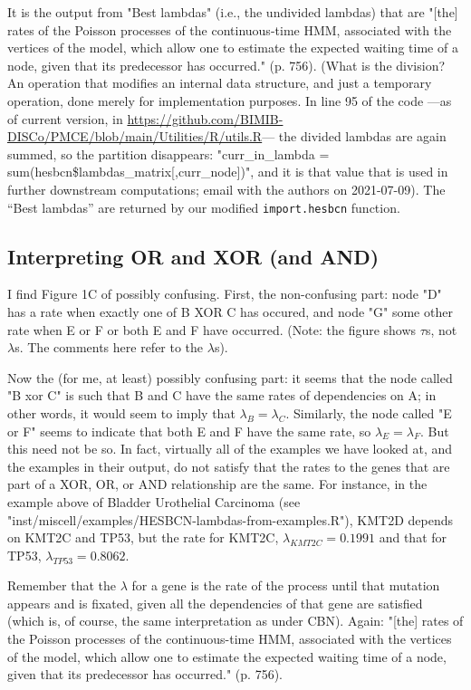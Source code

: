 \documentclass[a4paper,11pt]{article}
\begin{document}
It is the output from "Best lambdas" (i.e., the undivided lambdas) that are "[the] rates of the Poisson processes of the continuous-time HMM, associated with the vertices of the model, which allow one to estimate the expected waiting time of a node, given that its predecessor has occurred." (p. 756). (What is the division? An  operation that modifies an internal data structure, and just a temporary operation, done merely for implementation purposes. In line 95 of the code ---as of current version, in \url{https://github.com/BIMIB-DISCo/PMCE/blob/main/Utilities/R/utils.R}--- the divided lambdas are again summed, so the partition disappears: "curr\_in\_lambda = sum(hesbcn\$lambdas\_matrix[,curr\_node])", and it is that value that is used in further downstream computations;  email with the authors on 2021-07-09). The ``Best lambdas'' are returned by our modified \texttt{import.hesbcn} function.


\subsection{Interpreting OR and XOR (and AND)}

I find Figure 1C  of  \cite{angaroni2021} possibly confusing. First, the non-confusing part:  node "D" has a rate when exactly one of B XOR C has occured, and node "G" some other rate when E or F or both E and F have occurred. (Note: the figure shows $\tau$s, not $\lambda$s. The comments here refer to the $\lambda$s).


Now the (for me, at least) possibly confusing part: it seems that the node called "B xor C" is such that B and C have the same rates of dependencies on A; in other words, it would seem to imply that \(\lambda_B = \lambda_C\). Similarly, the node called "E or F" seems to indicate that both E and F have the same rate, so \(\lambda_E = \lambda_F\). But this need not be so. In fact, virtually all of the examples we have looked at, and the examples in their output, do not satisfy that the rates to the genes that are part of a XOR, OR, or AND relationship are the same. For instance, in the example above of Bladder Urothelial Carcinoma (see "inst/miscell/examples/HESBCN-lambdas-from-examples.R"), KMT2D depends on KMT2C and TP53, but the rate for KMT2C, \(\lambda_{KMT2C} = 0.1991\) and that for TP53, \(\lambda_{TP53} = 0.8062\).


Remember that the \(\lambda\) for a gene is the rate of the process until that mutation appears and is fixated, given all the dependencies of that gene are satisfied (which is, of course, the same interpretation as under CBN). Again:  "[the] rates of the Poisson processes of the continuous-time HMM, associated with the vertices of the model, which allow one to estimate the expected waiting time of a node, given that its predecessor has occurred." (p. 756).
\end{document}
